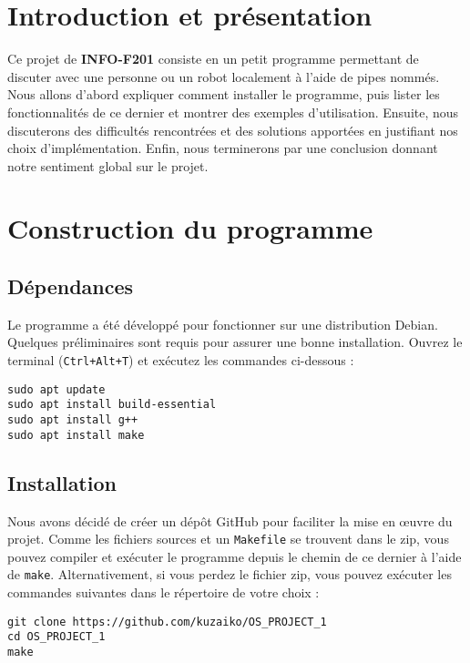 \documentclass{article}
\begin{document}
\newpage

\section{Introduction et présentation}
\label{introduction-et-presentation}

Ce projet de \textbf{INFO-F201} consiste en un petit programme permettant de discuter avec une personne ou un robot localement à l'aide de pipes nommés. 
Nous allons d'abord expliquer comment installer le programme, puis lister les fonctionnalités de ce dernier et montrer des exemples d'utilisation. 
Ensuite, nous discuterons des difficultés rencontrées et des solutions apportées en justifiant nos choix d'implémentation. 
Enfin, nous terminerons par une conclusion donnant notre sentiment global sur le projet.

\section{Construction du programme}
\label{construction-du-programme}


\subsection{Dépendances}
\label{Dépendances}
Le programme a été développé pour fonctionner sur une distribution Debian. 
Quelques préliminaires sont requis pour assurer une bonne installation. 
Ouvrez le terminal (\texttt{Ctrl+Alt+T}) et exécutez les commandes ci-dessous :

\begin{verbatim}
sudo apt update
sudo apt install build-essential
sudo apt install g++
sudo apt install make
\end{verbatim}

\subsection{Installation}
\label{Installation}
Nous avons décidé de créer un dépôt GitHub pour faciliter la mise en œuvre du projet. 
Comme les fichiers sources et un \texttt{Makefile} se trouvent dans le zip, vous pouvez compiler et exécuter le programme depuis le chemin de ce dernier à l'aide de \texttt{make}. 
Alternativement, si vous perdez le fichier zip, vous pouvez exécuter les commandes suivantes dans le répertoire de votre choix :

\begin{verbatim}
git clone https://github.com/kuzaiko/OS_PROJECT_1
cd OS_PROJECT_1
make
\end{verbatim}
\end{document}

